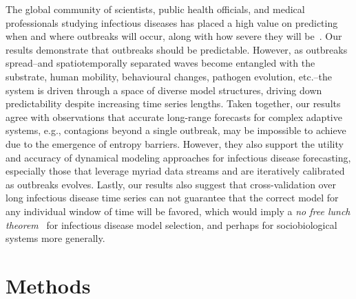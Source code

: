 \documentclass[fleqn,12pt]{wlscirep}
\begin{document}
The global community of scientists, public health officials, and medical professionals studying infectious diseases has placed a high value on predicting when and where outbreaks will occur, along with how severe they will be~\cite{hufnagel2004forecast, colizza2007predictability, altizer2013climate, myers2000forecasting}.  Our results demonstrate that outbreaks should be predictable.  However, as outbreaks spread--and spatiotemporally separated waves become entangled with the substrate, human mobility, behavioural changes, pathogen evolution, etc.--the system is driven through a space of diverse model structures, driving down predictability despite increasing time series lengths. Taken together, our results agree with observations that accurate long-range forecasts for complex adaptive systems, e.g., contagions beyond a single outbreak, may be impossible to achieve due to the emergence of entropy barriers.  However, they also support the utility and accuracy of dynamical modeling approaches for infectious disease forecasting, especially those that leverage myriad data streams and are iteratively calibrated as outbreaks evolves.   Lastly, our results also suggest that cross-validation over long infectious disease time series can not guarantee that the correct model for any individual window of time will be favored, which would imply a \textit{no free lunch theorem}~\cite{wolpert1997no} for infectious disease model selection, and perhaps for sociobiological systems more generally.

\section*{Methods}
\end{document}
